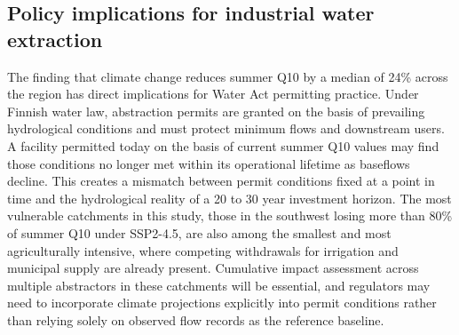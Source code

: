\documentclass[draft]{agujournal2019}
\begin{document}
\subsection{Policy implications for industrial water extraction}
The finding that climate change reduces summer Q10 by a median of 24\% across the region has direct implications for Water Act permitting practice. Under Finnish water law, abstraction permits are granted on the basis of prevailing hydrological conditions and must protect minimum flows and downstream users. A facility permitted today on the basis of current summer Q10 values may find those conditions no longer met within its operational lifetime as baseflows decline. This creates a mismatch between permit conditions fixed at a point in time and the hydrological reality of a 20 to 30 year investment horizon. The most vulnerable catchments in this study, those in the southwest losing more than 80\% of summer Q10 under SSP2-4.5, are also among the smallest and most agriculturally intensive, where competing withdrawals for irrigation and municipal supply are already present. Cumulative impact assessment across multiple abstractors in these catchments will be essential, and regulators may need to incorporate climate projections explicitly into permit conditions rather than relying solely on observed flow records as the reference baseline.
\end{document}
